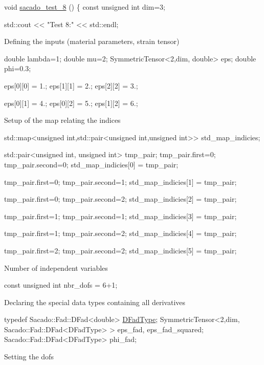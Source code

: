 \begin{DoxyCode}
\textcolor{keywordtype}{void} \hyperlink{Sacado__example_8cc_aa7108ff8393b98d66dfef50899d048d9}{sacado\_test\_8} ()
\{
    \textcolor{keyword}{const} \textcolor{keywordtype}{unsigned} \textcolor{keywordtype}{int} dim=3;
 
    std::cout << \textcolor{stringliteral}{"Test 8:"} << std::endl;
\end{DoxyCode}
 Defining the inputs (material parameters, strain tensor) 
\begin{DoxyCode}
\textcolor{keywordtype}{double} lambda=1;
\textcolor{keywordtype}{double} mu=2;
SymmetricTensor<2,dim, double> eps;
\textcolor{keywordtype}{double} phi=0.3;

eps[0][0] = 1.;
eps[1][1] = 2.;
eps[2][2] = 3.;

eps[0][1] = 4.;
eps[0][2] = 5.;
eps[1][2] = 6.;
\end{DoxyCode}
 Setup of the map relating the indices 
\begin{DoxyCode}
std::map<unsigned int,std::pair<unsigned int,unsigned int>> std\_map\_indicies;

std::pair<unsigned int, unsigned int> tmp\_pair;
tmp\_pair.first=0; tmp\_pair.second=0;
std\_map\_indicies[0] = tmp\_pair;

tmp\_pair.first=0; tmp\_pair.second=1;
std\_map\_indicies[1] = tmp\_pair;

tmp\_pair.first=0; tmp\_pair.second=2;
std\_map\_indicies[2] = tmp\_pair;

tmp\_pair.first=1; tmp\_pair.second=1;
std\_map\_indicies[3] = tmp\_pair;

tmp\_pair.first=1; tmp\_pair.second=2;
std\_map\_indicies[4] = tmp\_pair;

tmp\_pair.first=2; tmp\_pair.second=2;
std\_map\_indicies[5] = tmp\_pair;
\end{DoxyCode}
 Number of independent variables 
\begin{DoxyCode}
\textcolor{keyword}{const} \textcolor{keywordtype}{unsigned} \textcolor{keywordtype}{int} nbr\_dofs = 6+1;
\end{DoxyCode}
 Declaring the special data types containing all derivatives 
\begin{DoxyCode}
\textcolor{keyword}{typedef} Sacado::Fad::DFad<double> \hyperlink{Sacado__Wrapper_8h_a7e0893207b87dad05c66a34baac8ed2e}{DFadType};
SymmetricTensor<2,dim, Sacado::Fad::DFad<DFadType> > eps\_fad, eps\_fad\_squared;
Sacado::Fad::DFad<DFadType> phi\_fad;
\end{DoxyCode}
 Setting the dofs 
